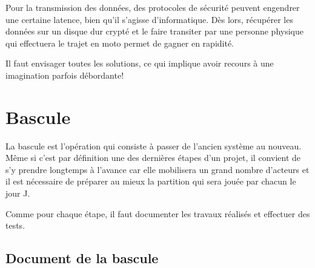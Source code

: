 \documentclass{book}
\begin{document}
Pour la transmission des données, des protocoles de sécurité peuvent engendrer une certaine latence, bien qu'il s'agisse d'informatique. Dès lors, récupérer les données sur un disque dur crypté et le faire transiter par une personne physique qui effectuera le trajet en moto permet de gagner en rapidité.

Il faut envisager toutes les solutions, ce qui implique avoir recours à une imagination parfois débordante!

\chapter{Bascule}

La bascule est l'opération qui consiste à passer de l'ancien système au nouveau. Même si c'est par définition une des dernières étapes d'un projet, il convient de s'y prendre longtemps à l'avance car elle mobilisera un grand nombre d'acteurs et il est nécessaire de préparer au mieux la partition qui sera jouée par chacun le jour J.

Comme pour chaque étape, il faut documenter les travaux réalisés et effectuer des tests.
	
\section{Document de la bascule}
\end{document}

